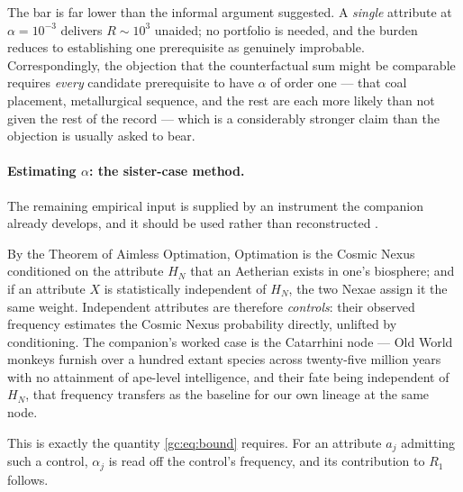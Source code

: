 \documentclass[11pt]{article}
\numberwithin{equation}{section}
\theoremstyle{plain}
\theoremstyle{definition}
\theoremstyle{remark}
\begin{document}
\noindent The bar is far lower than the informal argument suggested. A
\emph{single} attribute at $\alpha=10^{-3}$ delivers $R\sim10^{3}$
unaided; no portfolio is needed, and the burden reduces to establishing
one prerequisite as genuinely improbable. Correspondingly, the objection
that the counterfactual sum might be comparable requires \emph{every}
candidate prerequisite to have $\alpha$ of order one --- that coal
placement, metallurgical sequence, and the rest are each more likely
than not given the rest of the record --- which is a considerably
stronger claim than the objection is usually asked to bear.

\paragraph{Estimating $\alpha$: the sister-case method.} The remaining
empirical input is supplied by an instrument the companion already
develops, and it should be used rather than reconstructed
\cite{Nexus}.

By the Theorem of Aimless Optimation, Optimation is the Cosmic Nexus
conditioned on the attribute $H_N$ that an Aetherian exists in one's
biosphere; and if an attribute $X$ is statistically independent of
$H_N$, the two Nexae assign it the same weight. Independent attributes
are therefore \emph{controls}: their observed frequency estimates the
Cosmic Nexus probability directly, unlifted by conditioning. The
companion's worked case is the Catarrhini node --- Old World monkeys
furnish over a hundred extant species across twenty-five million years
with no attainment of ape-level intelligence, and their fate being
independent of $H_N$, that frequency transfers as the baseline for our
own lineage at the same node.

This is exactly the quantity \eqref{gc:eq:bound} requires. For an
attribute $a_j$ admitting such a control, $\alpha_j$ is read off the
control's frequency, and its contribution to $R_1$ follows.
\end{document}
